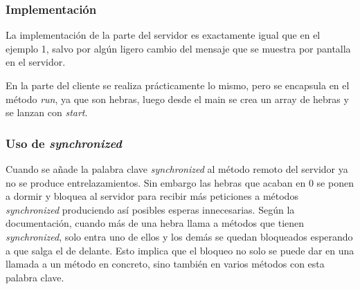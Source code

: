 \documentclass{article}
\begin{document}
\subsubsection{Implementación}
La implementación de la parte del servidor es exactamente igual que en el ejemplo 1, salvo por algún ligero cambio del mensaje que se muestra por pantalla en el servidor.

En la parte del cliente se realiza prácticamente lo mismo, pero se encapsula en el método \textit{run}, ya que son hebras, luego desde el main se crea un array de hebras y se lanzan con \textit{start}.

\newpage

\subsubsection{Uso de \textit{synchronized}}
Cuando se añade la palabra clave \textit{synchronized} al método remoto del servidor ya no se produce entrelazamientos. Sin embargo las hebras que acaban en 0 se ponen a dormir y bloquea al servidor para recibir más peticiones a métodos \textit{synchronized} produciendo así posibles esperas innecesarias. Según la documentación, cuando más de una hebra llama a métodos que tienen \textit{synchronized}, solo entra uno de ellos y los demás se quedan bloqueados esperando a que salga el de delante. Esto implica que el bloqueo no solo se puede dar en una llamada a un método en concreto, sino también en varios métodos con esta palabra clave.
\end{document}
